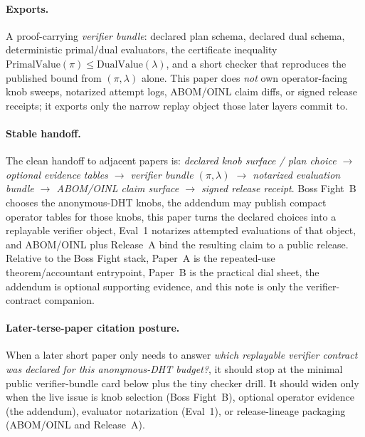 \documentclass[11pt]{article}
\begin{document}
\paragraph{Exports.}
A proof-carrying \emph{verifier bundle}: declared plan schema, declared dual schema, deterministic primal/dual evaluators, the certificate inequality $\mathrm{PrimalValue}(\pi)\le \mathrm{DualValue}(\lambda)$, and a short checker that reproduces the published bound from $(\pi,\lambda)$ alone.
This paper does \emph{not} own operator-facing knob sweeps, notarized attempt logs, ABOM/OINL claim diffs, or signed release receipts; it exports only the narrow replay object those later layers commit to.\cite{series:bossfightBaddendum,series:evalnotary,series:abomoinl,series:releaseproperty}

\paragraph{Stable handoff.}
The clean handoff to adjacent papers is:
\emph{declared knob surface / plan choice $\rightarrow$ optional evidence tables $\rightarrow$ verifier bundle $(\pi,\lambda)$ $\rightarrow$ notarized evaluation bundle $\rightarrow$ ABOM/OINL claim surface $\rightarrow$ signed release receipt}.
Boss Fight~B chooses the anonymous-DHT knobs, the addendum may publish compact operator tables for those knobs, this paper turns the declared choices into a replayable verifier object, Eval~1 notarizes attempted evaluations of that object, and ABOM/OINL plus Release~A bind the resulting claim to a public release.\cite{series:bossfightb,series:bossfightBaddendum,series:evalnotary,series:abomoinl,series:releaseproperty}
Relative to the Boss Fight stack, Paper~A is the repeated-use theorem/accountant entrypoint, Paper~B is the practical dial sheet, the addendum is optional supporting evidence, and this note is only the verifier-contract companion.

\paragraph{Later-terse-paper citation posture.}
When a later short paper only needs to answer \emph{which replayable verifier contract was declared for this anonymous-DHT budget?}, it should stop at the minimal public verifier-bundle card below plus the tiny checker drill.
It should widen only when the live issue is knob selection (Boss Fight~B), optional operator evidence (the addendum), evaluator notarization (Eval~1), or release-lineage packaging (ABOM/OINL and Release~A).\cite{series:bossfightb,series:bossfightBaddendum,series:evalnotary,series:abomoinl,series:releaseproperty}
\end{document}
